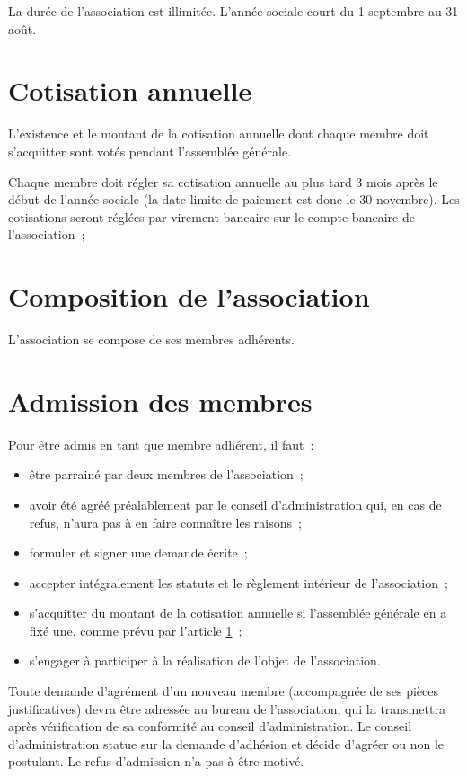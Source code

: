 \documentclass[12 pt]{article}
\begin{document}
La durée de l'association est illimitée. L'année sociale court du
1\ier{} septembre au 31 août.

\section{Cotisation annuelle}
\label{sec:cotisation-annuelle}

L'existence et le montant de la cotisation annuelle dont chaque membre
doit s'acquitter sont votés pendant l'assemblée générale.

Chaque membre doit régler sa cotisation annuelle au plus tard 3 mois
après le début de l'année sociale (la date limite de paiement est donc
le 30 novembre). Les cotisations seront réglées par virement bancaire
sur le compte bancaire de l'association~;

\section{Composition de l'association}
\label{sec:composition-de-l-association}

L'association se compose de ses membres adhérents.

\section{Admission des membres}
\label{sec:admission-des-membres}

Pour être admis en tant que membre adhérent, il faut~:

\begin{itemize}
\item être parrainé par deux membres de l'association~;
\item avoir été agréé préalablement par le conseil d'administration
  qui, en cas de refus, n'aura pas à en faire connaître les raisons~;
\item formuler et signer une demande écrite~;
\item accepter intégralement les statuts et le règlement intérieur de
  l'association~;
\item s'acquitter du montant de la cotisation annuelle si l'assemblée
  générale en a fixé une, comme prévu par l'article
  \ref{sec:cotisation-annuelle}~;
\item s'engager à participer à la réalisation de l'objet de
  l'association.
\end{itemize}

Toute demande d'agrément d'un nouveau membre (accompagnée de ses
pièces justificatives) devra être adressée au bureau de l'association,
qui la transmettra après vérification de sa conformité au conseil
d'administration. Le conseil d'administration statue sur la demande
d'adhésion et décide d'agréer ou non le postulant. Le refus
d'admission n'a pas à être motivé.
\end{document}
